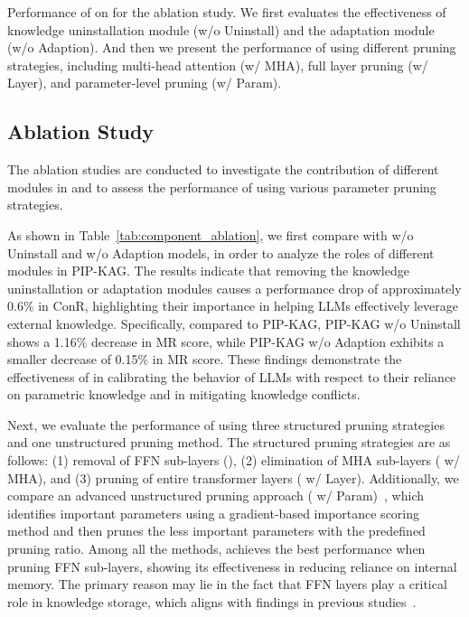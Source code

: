 \begin{table}[!t]
    \centering
    
    \caption{Performance of \method{} on \dataset{} for the ablation study. We first evaluates the effectiveness of knowledge uninstallation module (w/o Uninstall) and the adaptation module (w/o Adaption). And then we present the performance of \method{} using different pruning strategies, including multi-head attention (w/ MHA), full layer pruning (w/ Layer), and parameter-level pruning (w/ Param). }
     \label{tab:component_ablation}
\end{table}

\subsection{Ablation Study}
\label{subsec:abations}
The ablation studies are conducted to investigate the contribution of different modules in \method{} and to assess the performance of \method{} using various parameter pruning strategies.

As shown in Table~\ref{tab:component_ablation}, we first compare \method{} with \method{} w/o Uninstall and \method{} w/o Adaption models, in order to analyze the roles of different modules in PIP-KAG. The results indicate that removing the knowledge uninstallation or adaptation modules causes a performance drop of approximately 0.6\% in ConR, highlighting their importance in helping LLMs effectively leverage external knowledge. Specifically, compared to PIP-KAG, PIP-KAG w/o Uninstall shows a 1.16\% decrease in $\text{MR}$ score, while PIP-KAG w/o Adaption exhibits a smaller decrease of 0.15\% in $\text{MR}$ score. These findings demonstrate the effectiveness of \method{} in calibrating the behavior of LLMs with respect to their reliance on parametric knowledge and in mitigating knowledge conflicts.

Next, we evaluate the performance of \method{} using three structured pruning strategies and one unstructured pruning method. The structured pruning strategies are as follows: (1) removal of FFN sub-layers (\method{}), (2) elimination of MHA sub-layers (\method{} w/ MHA), and (3) pruning of entire transformer layers (\method{} w/ Layer). Additionally, we compare an advanced unstructured pruning approach (\method{} w/ Param)~\cite{lee2018snip}, which identifies important parameters using a gradient-based importance scoring method and then prunes the less important parameters with the predefined pruning ratio.
Among all the methods, \method{} achieves the best performance when pruning FFN sub-layers, showing its effectiveness in reducing reliance on internal memory. The primary reason may lie in the fact that FFN layers play a critical role in knowledge storage, which aligns with findings in previous studies~\cite{geva2022transformer, dai2021knowledge}.


